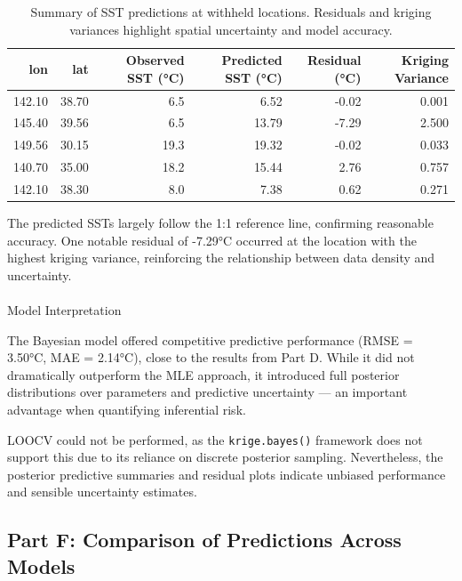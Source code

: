 \documentclass[
  11pt,
]{article}
\makeatletter
\let\oldparagraph\paragraph
\renewcommand{\paragraph}{
    \@ifstar
      \xxxParagraphStar
      \xxxParagraphNoStar
  }
\newcommand{\xxxParagraphStar}[1]{\oldparagraph*{#1}\mbox{}}
\newcommand{\xxxParagraphNoStar}[1]{\oldparagraph{#1}\mbox{}}
\makeatother
\begin{document}
\begin{table}

\caption{Summary of SST predictions at withheld locations. Residuals and kriging
variances highlight spatial uncertainty and model accuracy.}
\centering
\begin{tabular}[t]{rrrrrr}
\toprule
lon & lat & Observed SST (°C) & Predicted SST (°C) & Residual (°C) & Kriging Variance\\
\midrule
142.10 & 38.70 & 6.5 & 6.52 & -0.02 & 0.001\\
145.40 & 39.56 & 6.5 & 13.79 & -7.29 & 2.500\\
149.56 & 30.15 & 19.3 & 19.32 & -0.02 & 0.033\\
140.70 & 35.00 & 18.2 & 15.44 & 2.76 & 0.757\\
142.10 & 38.30 & 8.0 & 7.38 & 0.62 & 0.271\\
\bottomrule
\end{tabular}
\end{table}

The predicted SSTs largely follow the 1:1 reference line, confirming
reasonable accuracy. One notable residual of -7.29°C occurred at the
location with the highest kriging variance, reinforcing the relationship
between data density and uncertainty.

\paragraph{Model Interpretation}\label{model-interpretation}

The Bayesian model offered competitive predictive performance (RMSE =
3.50°C, MAE = 2.14°C), close to the results from Part D. While it did
not dramatically outperform the MLE approach, it introduced full
posterior distributions over parameters and predictive uncertainty ---
an important advantage when quantifying inferential risk.

LOOCV could not be performed, as the \texttt{krige.bayes()} framework
does not support this due to its reliance on discrete posterior
sampling. Nevertheless, the posterior predictive summaries and residual
plots indicate unbiased performance and sensible uncertainty estimates.

\subsection{Part F: Comparison of Predictions Across
Models}\label{part-f-comparison-of-predictions-across-models}
\end{document}
